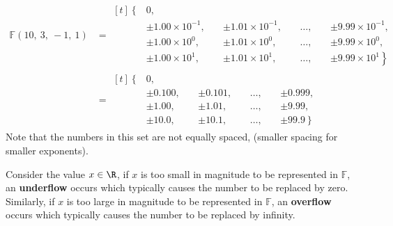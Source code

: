\documentclass{article}
\begin{document}
\begin{align*}
    \mathbb{F}\left( 10,\: 3,\: -1,\: 1\right) & =
    \begin{aligned}[t]
        \left\{\right. & 0,                                                                                                                \\
                       & \pm 1.00 \times 10^{-1},\: &  & \pm 1.01 \times 10^{-1},\: &  & \dots,\: &  & \pm 9.99 \times 10^{-1},            \\
                       & \pm 1.00 \times 10^0,\:    &  & \pm 1.01 \times 10^0,\:    &  & \dots,\: &  & \pm 9.99 \times 10^0,               \\
                       & \pm 1.00 \times 10^1,\:    &  & \pm 1.01 \times 10^1,\:    &  & \dots,\: &  & \pm 9.99 \times 10^1 \left.\right\}
    \end{aligned}
    \\
                                               & =
    \begin{aligned}[t]
        \left\{\right. & 0,                                                                        \\
                       & \pm 0.100,\: &  & \pm 0.101,\: &  & \dots,\: &  & \pm 0.999,              \\
                       & \pm 1.00,\:  &  & \pm 1.01,\:  &  & \dots,\: &  & \pm 9.99,               \\
                       & \pm 10.0,\:  &  & \pm 10.1,\:  &  & \dots,\: &  & \pm 99.9 \left.\right\}
    \end{aligned}
\end{align*}
Note that the numbers in this set are not equally spaced, (smaller
spacing for smaller exponents).
\begin{definition}
    Consider the value \(x \in \R\), if \(x\) is too small in magnitude
    to be represented in \(\mathbb{F}\), an \textbf{underflow} occurs
    which typically causes the number to be replaced by zero. Similarly,
    if \(x\) is too large in magnitude to be represented in
    \(\mathbb{F}\), an \textbf{overflow} occurs which typically causes
    the number to be replaced by infinity.
\end{definition}
\end{document}
